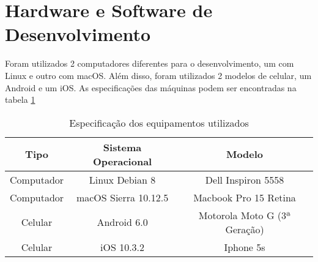 \section{Hardware e Software de Desenvolvimento}

Foram utilizados 2 computadores diferentes para o desenvolvimento, um com Linux e outro com macOS. Além disso, foram utilizados 2 modelos de celular, um Android e um iOS. As especificações das máquinas podem ser encontradas na tabela \ref{tab-hardware}

\begin{table}[h]
    \centering
    \caption{Especificação dos equipamentos utilizados}
    \label{tab-hardware}
    \begin{tabular}{|c|c|c|}\hline
        \textbf{Tipo} & \textbf{Sistema Operacional} & \textbf{Modelo}              \\ \hline
        Computador    & Linux Debian 8               & Dell Inspiron 5558           \\ \hline
        Computador    & macOS Sierra 10.12.5         & Macbook Pro 15 Retina        \\ \hline
        Celular       & Android 6.0                  & Motorola Moto G (3ª Geração) \\ \hline
        Celular       & iOS 10.3.2                   & Iphone 5s                    \\ \hline
    \end{tabular}
\end{table}
